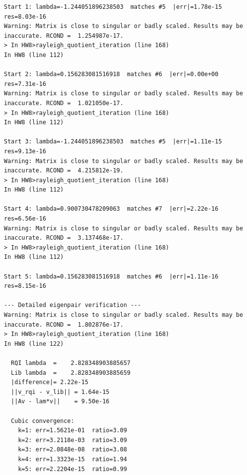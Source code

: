 \documentclass[11pt]{article}
\begin{document}
\begin{verbatim}
Start 1: lambda=-1.244051896238503  matches #5  |err|=1.78e-15  res=8.03e-16
Warning: Matrix is close to singular or badly scaled. Results may be inaccurate. RCOND =  1.254987e-17. 
> In HW8>rayleigh_quotient_iteration (line 168)
In HW8 (line 112)
 
Start 2: lambda=0.156283081516918  matches #6  |err|=0.00e+00  res=7.31e-16
Warning: Matrix is close to singular or badly scaled. Results may be inaccurate. RCOND =  1.021050e-17. 
> In HW8>rayleigh_quotient_iteration (line 168)
In HW8 (line 112)
 
Start 3: lambda=-1.244051896238503  matches #5  |err|=1.11e-15  res=9.13e-16
Warning: Matrix is close to singular or badly scaled. Results may be inaccurate. RCOND =  4.215812e-19. 
> In HW8>rayleigh_quotient_iteration (line 168)
In HW8 (line 112)
 
Start 4: lambda=0.900730478209063  matches #7  |err|=2.22e-16  res=6.56e-16
Warning: Matrix is close to singular or badly scaled. Results may be inaccurate. RCOND =  3.137468e-17. 
> In HW8>rayleigh_quotient_iteration (line 168)
In HW8 (line 112)
 
Start 5: lambda=0.156283081516918  matches #6  |err|=1.11e-16  res=8.15e-16

--- Detailed eigenpair verification ---
Warning: Matrix is close to singular or badly scaled. Results may be inaccurate. RCOND =  1.802876e-17. 
> In HW8>rayleigh_quotient_iteration (line 168)
In HW8 (line 122)
 
  RQI lambda  =    2.828348903885657
  Lib lambda  =    2.828348903885659
  |difference|= 2.22e-15
  ||v_rqi - v_lib|| = 1.64e-15
  ||Av - lam*v||    = 9.50e-16

  Cubic convergence:
    k=1: err=1.5621e-01  ratio=3.09
    k=2: err=3.2118e-03  ratio=3.09
    k=3: err=2.0848e-08  ratio=3.08
    k=4: err=1.3323e-15  ratio=1.94
    k=5: err=2.2204e-15  ratio=0.99
\end{verbatim}
\end{document}
